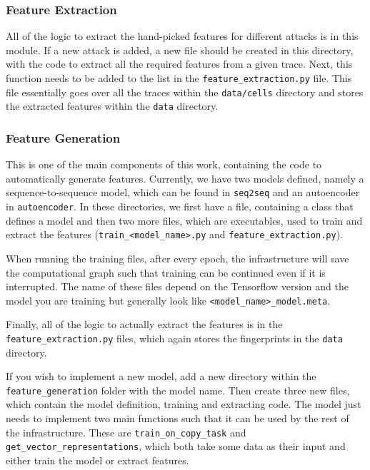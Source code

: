 \subsubsection{Feature Extraction}

All of the logic to extract the hand-picked features for different attacks is in this module.
If a new attack is added, a new file should be created in this directory, with the code to extract all the required features from a given trace.
Next, this function needs to be added to the list in the \texttt{feature\_extraction.py} file.
This file essentially goes over all the traces within the \texttt{data/cells} directory and stores the extracted features within the \texttt{data} directory.

\subsubsection{Feature Generation}

This is one of the main components of this work, containing the code to automatically generate features.
Currently, we have two models defined, namely a sequence-to-sequence model, which can be found in \texttt{seq2seq} and an autoencoder in \texttt{autoencoder}.
In these directories, we first have a file, containing a class that defines a model and then two more files, which are executables, used to train and extract the features (\texttt{train\_<model\_name>.py} and \texttt{feature\_extraction.py}).

When running the training files, after every epoch, the infrastructure will save the computational graph such that training can be continued even if it is interrupted.
The name of these files depend on the Tensorflow version and the model you are training but generally look like \texttt{<model\_name>\_model.meta}.

Finally, all of the logic to actually extract the features is in the \texttt{feature\_extraction.py} files, which again stores the fingerprints in the \texttt{data} directory.

If you wish to implement a new model, add a new directory within the \texttt{feature\_generation} folder with the model name.
Then create three new files, which contain the model definition, training and extracting code.
The model  just needs to implement two main functions such that it can be used by the rest of the infrastructure.
These are \texttt{train\_on\_copy\_task} and \texttt{get\_vector\_representations}, which both take some data as their input and either train the model or extract features.

